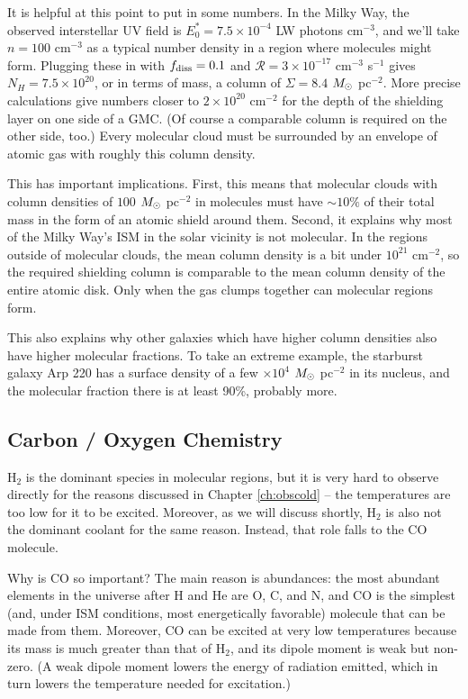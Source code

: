 It is helpful at this point to put in some numbers. In the Milky Way, the observed interstellar UV field is $E^*_0=7.5\times 10^{-4}$ LW photons cm$^{-3}$, and we'll take $n=100$ cm$^{-3}$ as a typical number density in a region where molecules might form.  Plugging these in with $f_{\rm diss}=0.1$ and $\mathcal{R}=3\times 10^{-17}$ cm$^{-3}$ s$^{-1}$ gives $N_H = 7.5\times 10^{20}$, or in terms of mass, a column of $\Sigma=8.4$ $M_{\odot}$ pc$^{-2}$. More precise calculations give numbers closer to $2\times 10^{20}$ cm$^{-2}$ for the depth of the shielding layer on one side of a GMC. (Of course a comparable column is required on the other side, too.) Every molecular cloud must be surrounded by an envelope of atomic gas with roughly this column density.

This has important implications. First, this means that molecular clouds with column densities of $100$ $M_{\odot}$ pc$^{-2}$ in molecules must have $\sim 10\%$ of their total mass in the form of an atomic shield around them. Second, it explains why most of the Milky Way's ISM in the solar vicinity is not molecular. In the regions outside of molecular clouds, the mean column density is a bit under $10^{21}$ cm$^{-2}$, so the required shielding column is comparable to the mean column density of the entire atomic disk. Only when the gas clumps together can molecular regions form.

This also explains why other galaxies which have higher column densities also have higher molecular fractions. To take an extreme example, the starburst galaxy Arp 220 has a surface density of a few $\times 10^4$ $M_{\odot}$ pc$^{-2}$ in its nucleus, and the molecular fraction there is at least 90\%, probably more.

\subsection{Carbon / Oxygen Chemistry}

H$_2$ is the dominant species in molecular regions, but it is very hard to observe directly for the reasons discussed in Chapter \ref{ch:obscold} -- the temperatures are too low for it to be excited. Moreover, as we will discuss shortly, H$_2$ is also not the dominant coolant for the same reason. Instead, that role falls to the CO molecule.

Why is CO so important? The main reason is abundances: the most abundant elements in the universe after H and He are O, C, and N, and CO is the simplest (and, under ISM conditions, most energetically favorable) molecule that can be made from them. Moreover, CO can be excited at very low temperatures because its mass is much greater than that of H$_2$, and its dipole moment is weak but non-zero. (A weak dipole moment lowers the energy of radiation emitted, which in turn lowers the temperature needed for excitation.)

